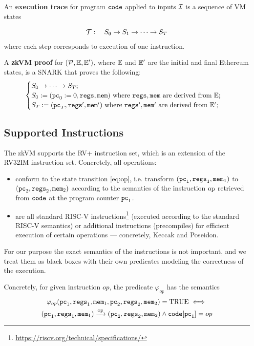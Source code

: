An \textbf{execution trace} for program $\mathtt{code}$ applied to inputs $\mathcal{I}$ is a sequence of VM states

\[
\mathcal{T}:\quad S_0 \rightarrow S_1 \rightarrow \cdots \rightarrow S_T
\]
where each step corresponds to execution of one instruction.


A \textbf{zkVM proof} for $(\mathcal{P},\mathbb{E},\mathbb{E}')$,
where $\mathbb{E}$ and $\mathbb{E}'$ are the initial and final Ethereum states, is a SNARK that proves the following:
$$
\begin{cases}
S_0\rightarrow\cdots\rightarrow S_T;\\
S_0:=(\mathtt{pc}_0:=0,\mathtt{regs},\mathtt{mem})\text{ where $\mathtt{regs},\mathtt{mem}$ are derived from }\mathbb{E};\\
S_T:=(\mathtt{pc}_T,\mathtt{regs}',\mathtt{mem}')\text{ where $\mathtt{regs}',\mathtt{mem}'$ are derived from }\mathbb{E}';\\
\end{cases}
$$

\subsection{Supported Instructions}
The zkVM supports the RV+ instruction set, which is an extension of the RV32IM instruction set.
Concretely, all operations:
\begin{itemize}
    \item conform to the state transition \eqref{eq:op}, i.e.
    transform $(\mathtt{pc}_1,\mathtt{regs}_1,\mathtt{mem}_1)$ to $(\mathtt{pc}_2,\mathtt{regs}_2,\mathtt{mem}_2)$ according to the semantics of the instruction $\mathrm{op}$ retrieved from $\mathtt{code}$ at the program counter $\mathtt{pc}_1$.
    \item are all standard RISC-V instructions\footnote{\url{https://riscv.org/technical/specifications/}} (executed according to the standard RISC-V semantics)
     or additional
    instructions (precompiles) for efficient execution of certain operations --- concretely,
    Keccak and Poseidon.
\end{itemize}
For our purpose the exact semantics of the instructions is not important,
and we treat them as black boxes with their own predicates modeling the correctness of the execution.

Concretely, for given instruction $op$, the predicate $\varphi_{op}$  has the semantics
\begin{multline}\label{eq:phiop}
\varphi_{op}(\mathtt{pc}_1,\mathtt{regs}_1,\mathtt{mem}_1,\mathtt{pc}_2,\mathtt{regs}_2,\mathtt{mem}_2)=\mathrm{TRUE} \;\Longleftrightarrow\;\\
 (\mathtt{pc}_1,\mathtt{regs}_1,\mathtt{mem}_1)\xrightarrow{\mathrm{op}} (\mathtt{pc}_2,\mathtt{regs}_2,\mathtt{mem}_2) \wedge \mathtt{code}[\mathtt{pc}_1]=op
\end{multline}

